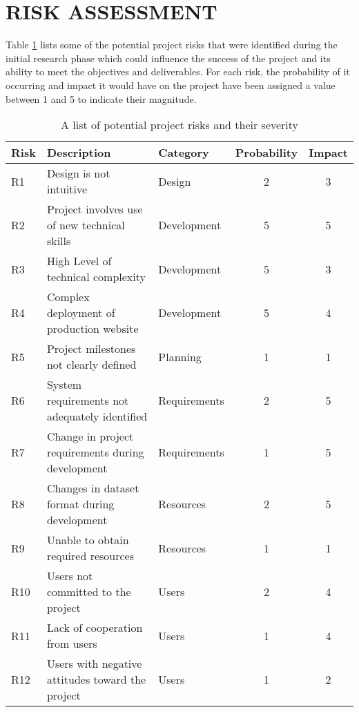 \newpage
\section{RISK ASSESSMENT \hrulefill}

Table \ref{tab:risk-assessment} lists some of the potential project risks that
were identified during the initial research phase which could influence the
success of the project and its ability to meet the objectives and
deliverables. For each risk, the probability of it occurring and impact it would
have on the project have been assigned a value between 1 and 5 to indicate their
magnitude.

\begin{table}[H]
\centering
\begin{tabular}{ | l | l | l || c | c | }
\hline
\textbf{Risk} & \textbf{Description} & \textbf{Category} &
\textbf{Probability} & \textbf{Impact}\\
\hline
R1  & Design is not intuitive                           & Design       & 2 & 3\\
R2  & Project involves use of new technical skills      & Development  & 5 & 5\\
R3  & High Level of technical complexity                & Development  & 5 & 3\\
R4  & Complex deployment of production website          & Development  & 5 & 4\\
R5  & Project milestones not clearly defined            & Planning     & 1 & 1\\
R6  & System requirements not adequately identified     & Requirements & 2 & 5\\
R7  & Change in project requirements during development & Requirements & 1 & 5\\
R8  & Changes in dataset format during development      & Resources    & 2 & 5\\
R9  & Unable to obtain required resources               & Resources    & 1 & 1\\
R10 & Users not committed to the project                & Users        & 2 & 4\\
R11 & Lack of cooperation from users                    & Users        & 1 & 4\\
R12 & Users with negative attitudes toward the project  & Users        & 1 & 2\\
\hline
\end{tabular}
\caption{A list of potential project risks and their severity}
\label{tab:risk-assessment}
\end{table}

